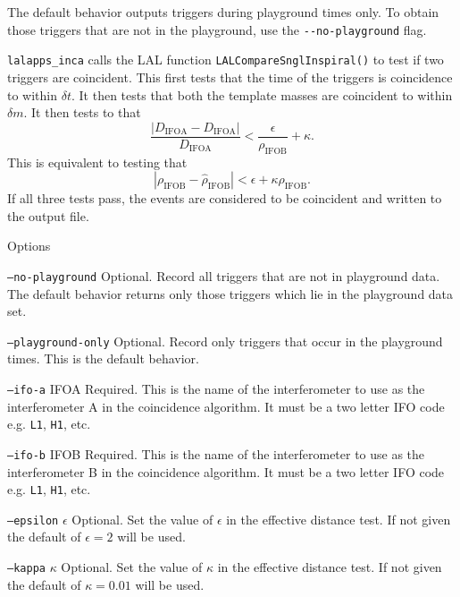 \begin{entry}
The default behavior outputs triggers during playground times only. To obtain
those triggers that are not in the playground, use the \verb$--no-playground$
flag.     

\texttt{lalapps\_inca} calls the LAL function
\texttt{LALCompareSnglInspiral()} to test if two triggers are coincident. This
first tests that the time of the triggers is coincidence to within $\delta t$.
It then tests that both the template masses are coincident to within $\delta m$.
It then tests to that
\begin{equation}
\frac{\left|D_\mathrm{IFOA} - D_\mathrm{IFOA}\right|}{D_\mathrm{IFOA}}
< \frac{\epsilon}{\rho_\mathrm{IFOB}} + \kappa.
\end{equation}
This is equivalent to testing that
\begin{equation}
\left|\rho_\mathrm{IFOB} - \hat{\rho}_\mathrm{IFOB}\right| 
< \epsilon + \kappa\rho_\mathrm{IFOB}.
\end{equation}
If all three tests pass, the events are considered to be coincident and
written to the output file.

\item[Options]\leavevmode
\begin{entry}
\item[\texttt{--no-playground}] Optional.  Record all triggers that are
not in playground data.  The default behavior returns only those triggers
which lie in the playground data set.  

\item[\texttt{--playground-only}] Optional.  Record only triggers that
occur in the playground times.  This is the default behavior.

\item[\texttt{--ifo-a} \textsc{IFOA}] Required. This is the name of the
interferometer to use as the interferometer A in the coincidence algorithm.
It must be a two letter IFO code e.g. \texttt{L1}, \texttt{H1}, etc.

\item[\texttt{--ifo-b} \textsc{IFOB}] Required. This is the name of the
interferometer to use as the interferometer B in the coincidence algorithm.
It must be a two letter IFO code e.g. \texttt{L1}, \texttt{H1}, etc.

\item[\texttt{--epsilon} \textsc{$\epsilon$}] Optional. Set the value of
$\epsilon$ in the effective distance test. If not given the default of
$\epsilon = 2$ will be used.

\item[\texttt{--kappa} \textsc{$\kappa$}] Optional. Set the value of
$\kappa$ in the effective distance test. If not given the default of
$\kappa= 0.01$ will be used.


\end{entry}
\end{entry}
